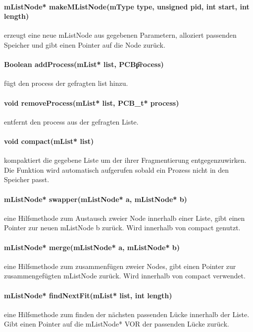 \paragraph{mListNode* makeMListNode(mType type, unsigned pid, int start, int length)} erzeugt eine neue mListNode aus gegebenen Parametern, alloziert passenden Speicher und gibt einen Pointer auf die Node zurück.

\paragraph{Boolean addProcess(mList* list, PCB\t* process)} fügt den process der gefragten list hinzu.

\paragraph{void removeProcess(mList* list, PCB\_t* process)} entfernt den process aus der gefragten Liste.

\paragraph{void compact(mList* list)} kompaktiert die gegebene Liste um der ihrer Fragmentierung entgegenzuwirken. Die Funktion wird automatisch aufgerufen sobald ein Prozess nicht in den Speicher passt.

\paragraph{mListNode* swapper(mListNode* a, mListNode* b)} eine Hilfsmethode zum Austausch zweier Node innerhalb einer Liste, gibt einen Pointer zur neuen mListNode b zurück. Wird innerhalb von compact genutzt.

\paragraph{mListNode* merge(mListNode* a, mListNode* b)} eine Hilfsmethode zum zusammenfügen zweier Nodes, gibt einen Pointer zur zusammengefügten mListNode zurück. Wird innerhalb von compact verwendet.

\paragraph{mListNode* findNextFit(mList* list, int length)} eine Hilfsmethode zum finden der nächsten passenden Lücke innerhalb der Liste. Gibt einen Pointer auf die mListNode* VOR der passenden Lücke zurück.
